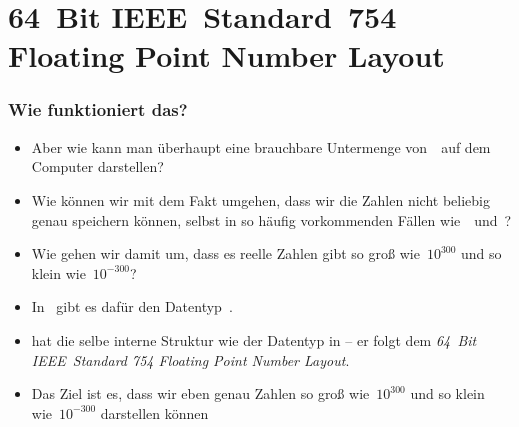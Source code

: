 \documentclass[aspectratio=169,mathserif,notheorems]{beamer}%
\begin{document}
\section{64~Bit IEEE~Standard~754 Floating Point Number Layout}%
%
\begin{frame}%
\frametitle{Wie funktioniert das?}%
\begin{itemize}%
\item Aber wie kann man überhaupt eine brauchbare Untermenge von~\realNumbers\ auf dem Computer darstellen?%
\item<2-> Wie können wir mit dem Fakt umgehen, dass wir die Zahlen nicht beliebig genau speichern können, selbst in so häufig vorkommenden Fällen wie~\numberPi\ und~\numberE?%
\item<3-> Wie gehen wir damit um, dass es reelle Zahlen gibt so groß wie~$10^{300}$ und so klein wie~$10^{-300}$?%
\item<4-> In \python\ gibt es dafür den Datentyp~.%
\item<5->  hat die selbe interne Struktur wie der Datentyp  in  -- er folgt dem \emph{64~Bit IEEE~Standard 754 Floating Point Number Layout}.%
\item<6-> Das Ziel ist es, dass wir eben genau Zahlen so groß wie~$10^{300}$ und so klein wie~$10^{-300}$ darstellen können%
\end{itemize}%
\end{frame}%
\end{document}
